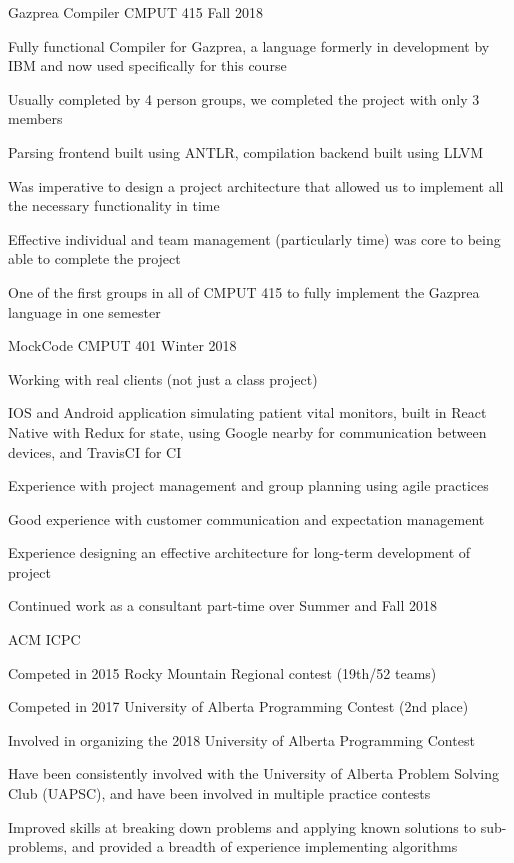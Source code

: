 \begin{cventries}
  \cventry
    {} %
    {Gazprea Compiler} %
    {CMPUT 415} %
    {Fall 2018} %
    {
      \begin{cvitems}
      \item {Fully functional Compiler for Gazprea, a language formerly in development by IBM and now used specifically for this course}
      \item {Usually completed by 4 person groups, we completed the project with only 3 members}
      \item {Parsing frontend built using ANTLR, compilation backend built using LLVM}
      \item {Was imperative to design a project architecture that allowed us to implement all the necessary functionality in time}
      \item {Effective individual and team management (particularly time) was core to being able to complete the project}
      \item {One of the first groups in all of CMPUT 415 to fully implement the Gazprea language in one semester}
      \end{cvitems}
    }

  \cventry
    {}
    {MockCode}
    {CMPUT 401}
    {Winter 2018}
    {
      \begin{cvitems}
      \item {Working with real clients (not just a class project)}
      \item {IOS and Android application simulating patient vital monitors, built in React Native 
        with Redux for state, using Google nearby for communication between devices, and TravisCI for CI}
      \item {Experience with project management and group planning using agile practices}
      \item {Good experience with customer communication and expectation management}
      \item {Experience designing an effective architecture for long-term development of project}
      \item {Continued work as a consultant part-time over Summer and Fall 2018}
      \end{cvitems}
    }

  \cventry
    {}
    {ACM ICPC}
    {}
    {}
    {
      \begin{cvitems}
      \item {Competed in 2015 Rocky Mountain Regional contest (19th/52 teams)}
      \item {Competed in 2017 University of Alberta Programming Contest (2nd place)}
      \item {Involved in organizing the 2018 University of Alberta Programming Contest}
      \item {Have been consistently involved with the University of Alberta Problem Solving Club (UAPSC),
        and have been involved in multiple practice contests}
      \item {Improved skills at breaking down problems and applying known solutions to sub-problems, and provided
        a breadth of experience implementing algorithms}
      \end{cvitems}
    }


\end{cventries}
